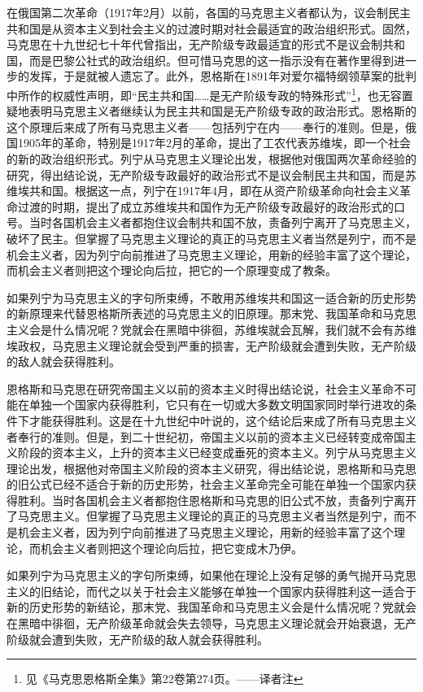 在俄国第二次革命（1917年2月）以前，各国的马克思主义者都认为，议会制民主共和国是从资本主义到社会主义的过渡时期对社会最适宜的政治组织形式。固然，马克思在十九世纪七十年代曾指出，无产阶级专政最适宜的形式不是议会制共和国，而是巴黎公社式的政治组织。但可惜马克思的这一指示没有在著作里得到进一步的发挥，于是就被人遗忘了。此外，恩格斯在1891年对爱尔福特纲领草案的批判中所作的权威性声明，即“民主共和国……是无产阶级专政的特殊形式”\footnote{见《马克思恩格斯全集》第22卷第274页。——译者注}，也无容置疑地表明马克思主义者继续认为民主共和国是无产阶级专政的政治形式。恩格斯的这个原理后来成了所有马克思主义者——包括列宁在内——奉行的准则。但是，俄国1905年的革命，特别是1917年2月的革命，提出了工农代表苏维埃，即一个社会的新的政治组织形式。列宁从马克思主义理论出发，根据他对俄国两次革命经验的研究，得出结论说，无产阶级专政最好的政治形式不是议会制民主共和国，而是苏维埃共和国。根据这一点，列宁在1917年4月，即在从资产阶级革命向社会主义革命过渡的时期，提出了成立苏维埃共和国作为无产阶级专政最好的政治形式的口号。当时各国机会主义者都抱住议会制共和国不放，责备列宁离开了马克思主义，破坏了民主。但掌握了马克思主义理论的真正的马克思主义者当然是列宁，而不是机会主义者，因为列宁向前推进了马克思主义理论，用新的经验丰富了这个理论，而机会主义者则把这个理论向后拉，把它的一个原理变成了教条。

如果列宁为马克思主义的字句所束缚，不敢用苏维埃共和国这一适合新的历史形势的新原理来代替恩格斯所表述的马克思主义的旧原理。那末党、我国革命和马克思主义会是什么情况呢？党就会在黑暗中徘徊，苏维埃就会瓦解，我们就不会有苏维埃政权，马克思主义理论就会受到严重的损害，无产阶级就会遭到失败，无产阶级的敌人就会获得胜利。

恩格斯和马克思在研究帝国主义以前的资本主义时得出结论说，社会主义革命不可能在单独一个国家内获得胜利，它只有在一切或大多数文明国家同时举行进攻的条件下才能获得胜利。这是在十九世纪中叶说的，这个结论后来成了所有马克思主义者奉行的准则。但是，到二十世纪初，帝国主义以前的资本主义已经转变成帝国主义阶段的资本主义，上升的资本主义已经变成垂死的资本主义。列宁从马克思主义理论出发，根据他对帝国主义阶段的资本主义研究，得出结论说，恩格斯和马克思的旧公式已经不适合于新的历史形势，社会主义革命完全可能在单独一个国家内获得胜利。当时各国机会主义者都抱住恩格斯和马克思的旧公式不放，责备列宁离开了马克思主义。但掌握了马克思主义理论的真正的马克思主义者当然是列宁，而不是机会主义者，因为列宁向前推进了马克思主义理论，用新的经验丰富了这个理论，而机会主义者则把这个理论向后拉，把它变成木乃伊。

如果列宁为马克思主义的字句所束缚，如果他在理论上没有足够的勇气抛开马克思主义的旧结论，而代之以关于社会主义能够在单独一个国家内获得胜利这一适合于新的历史形势的新结论，那末党、我国革命和马克思主义会是什么情况呢？党就会在黑暗中徘徊，无产阶级革命就会失去领导，马克思主义理论就会开始衰退，无产阶级就会遭到失败，无产阶级的敌人就会获得胜利。

